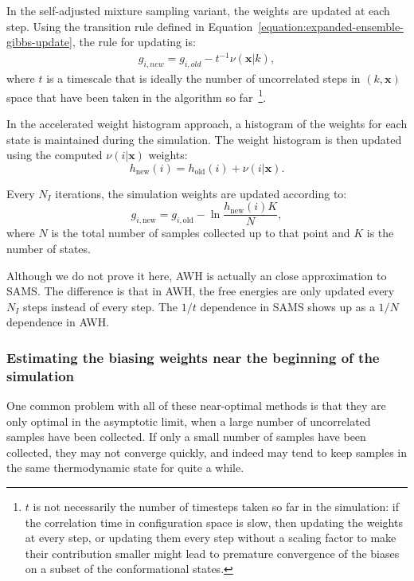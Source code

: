 \documentclass[9pt,review]{livecoms}
\newcommand{\vx}{\mathbf{x}}
\begin{document}
In the self-adjusted mixture sampling variant, the weights are updated at each step. Using the transition rule defined in Equation~\ref{equation:expanded-ensemble-gibbs-update}, the rule for updating is:
\begin{eqnarray}
g_{i,new} = g_{i,old} - t^{-1}\nu(\vx|k),
\end{eqnarray}
where $t$ is a timescale that is ideally the number of uncorrelated steps in $(k,\vx)$ space that have been taken in the algorithm so far~\footnote{$t$ is not necessarily the number of timesteps taken so far in the simulation: if the correlation time in configuration space is slow, then updating the weights at every step, or updating them every step without a scaling factor to make their contribution smaller might lead to premature convergence of the biases on a subset of the conformational states.}.

In the accelerated weight histogram approach, a histogram of the weights for each state is maintained during the simulation. The weight histogram is then updated using the computed $\nu(i|\vx)$ weights:
\begin{equation}
h_{\mathrm{new}}(i) = h_{\mathrm{old}}(i) + \nu(i|\vx).
\label{eq:awh-weight-histogram}
\end{equation}

Every $N_I$ iterations, the simulation weights are updated according to:
\begin{equation}
g_{i,\mathrm{new}} = g_{i,\mathrm{old}} - \ln{\frac{h_{\mathrm{new}}(i)K}{N}},
\label{eq:awh_free_energy_up}
\end{equation}
where $N$ is the total number of samples collected up to that point and $K$ is the number of states.


Although we do not prove it here, AWH is actually an close approximation to SAMS. The difference is that in AWH, the free energies are only updated every $N_I$ steps instead of every step. The $1/t$ dependence in SAMS shows up as a $1/N$ dependence in AWH.

\subsubsection{Estimating the biasing weights near the beginning of the simulation}

One common problem with all of these near-optimal methods is that they are only optimal in the asymptotic limit, when a large number of uncorrelated samples have been collected.  If only a small number of samples have been collected, they may not converge quickly, and indeed may tend to keep samples in the same thermodynamic state for quite a while.
\end{document}
